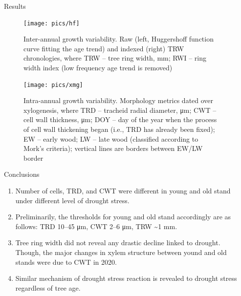 \documentclass[final]{beamer}
\newlength{\sepwidth}
\newlength{\colwidth}
\newcommand{\separatorcolumn}{\begin{column}{\sepwidth}\end{column}}
\begin{document}
\begin{frame}[t]
\begin{columns}[t]
\begin{column}{\colwidth}
\end{column}


\begin{column}{\colwidth}

\begin{block}{Results}
        \begin{figure}
            \centering \texttt{[image: pics/hf]}
            \caption{Inter-annual growth variability. Raw (left, Huggershoff function curve fitting the age trend) and indexed (right) TRW chronologies, where TRW -- tree ring width, \si{mm}; RWI -- ring width index (low frequency age trend is removed)}
            \label{fig:hf}
        \end{figure}
        \begin{figure}
            \centering \texttt{[image: pics/xmg]}
            \caption{Intra-annual growth variability. Morphology metrics dated over xylogenesis, where TRD -- tracheid radial diameter, \si{\micro\meter}; CWT -- cell wall thickness, \si{\micro\meter}; DOY -- day of the year when the process of cell wall thickening began (i.e., TRD has already been fixed); EW -- early wood; LW -- late wood (classified according to Mork's criteria); vertical lines are borders between EW/LW border}
            \label{fig:xmg}
        \end{figure}
\end{block}

\begin{block}{Conclusions}
    \begin{enumerate}
        \item Number of cells, TRD, and CWT were different in young and old stand under different level of drought stress.
        \item Preliminarily, the thresholds for young and old stand accordingly are as follows: TRD 10--45 \si{\micro\meter}, CWT 2--6 \si{\micro\meter}, TRW \sim 1 \si{mm}.
        \item Tree ring width did not reveal any drastic decline linked to drought. Though, the major changes in xylem structure between yound and old stands were due to CWT in 2020.
        \item Similar mechanism of drought stress reaction is revealed to drought stress regardless of tree age.
    \end{enumerate}
\end{block}

\end{column}
\end{columns}

\begin{columns}[c]
\begin{column}{0.96\paperwidth}

\end{column}


\end{columns}
\end{frame}
\end{document}

